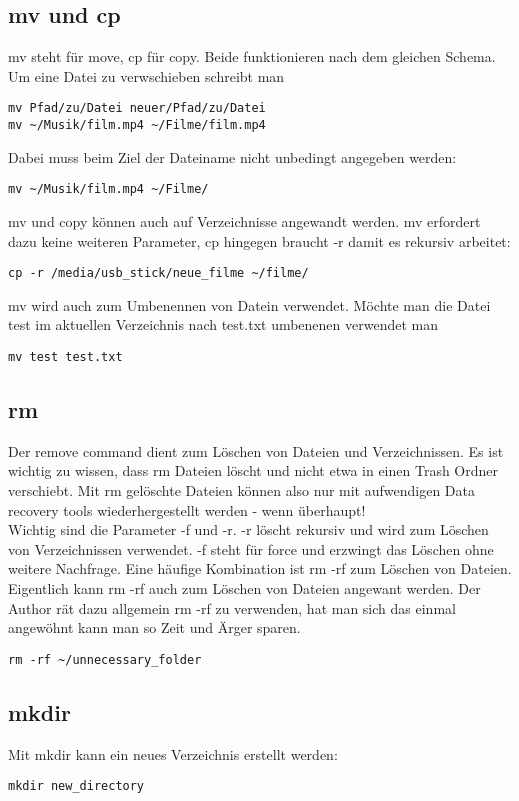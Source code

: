 \subsection{mv und cp}
mv steht f\"ur move, cp f\"ur copy. Beide funktionieren nach dem gleichen Schema. Um eine Datei zu verwschieben schreibt man
\begin{lstlisting}[frame=single]
mv Pfad/zu/Datei neuer/Pfad/zu/Datei
mv ~/Musik/film.mp4 ~/Filme/film.mp4
\end{lstlisting}
Dabei muss beim Ziel der Dateiname nicht unbedingt angegeben werden:
\begin{lstlisting}[frame=single]
mv ~/Musik/film.mp4 ~/Filme/
\end{lstlisting}
mv und copy k\"onnen auch auf Verzeichnisse angewandt werden. mv erfordert dazu keine weiteren Parameter, cp hingegen braucht -r damit es rekursiv arbeitet:
\begin{lstlisting}[frame=single]
cp -r /media/usb_stick/neue_filme ~/filme/
\end{lstlisting}
mv wird auch zum Umbenennen von Datein verwendet. M\"ochte man die Datei test im aktuellen Verzeichnis nach test.txt umbenenen verwendet man
\begin{lstlisting}[frame=single]
mv test test.txt
\end{lstlisting}
\subsection{rm}
Der remove command dient zum L\"oschen von Dateien und Verzeichnissen. Es ist wichtig zu wissen, dass rm Dateien l\"oscht und nicht etwa in einen Trash Ordner verschiebt. Mit rm gel\"oschte Dateien k\"onnen also nur mit aufwendigen Data recovery tools wiederhergestellt werden - wenn \"uberhaupt!\\
Wichtig sind die Parameter -f und -r. -r l\"oscht rekursiv und wird zum L\"oschen von Verzeichnissen verwendet. -f steht f\"ur force und erzwingt das L\"oschen ohne weitere Nachfrage. Eine h\"aufige Kombination ist rm -rf zum L\"oschen von Dateien. Eigentlich kann rm -rf auch zum L\"oschen von Dateien angewant werden. Der Author r\"at dazu allgemein rm -rf zu verwenden, hat man sich das einmal angew\"ohnt kann man so Zeit und \"Arger sparen.
\begin{lstlisting}[frame=single]
rm -rf ~/unnecessary_folder
\end{lstlisting}
\subsection{mkdir}
Mit mkdir kann ein neues Verzeichnis erstellt werden:
\begin{lstlisting}[frame=single]
mkdir new_directory
\end{lstlisting}
